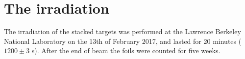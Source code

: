 \section{The irradiation}
The irradiation of the stacked targets was performed at the Lawrence Berkeley National Laboratory  on the 13th of February 2017, and lasted for 20 minutes ($1200 \pm 3$ s).  After the end of beam the foils were counted for five weeks. 